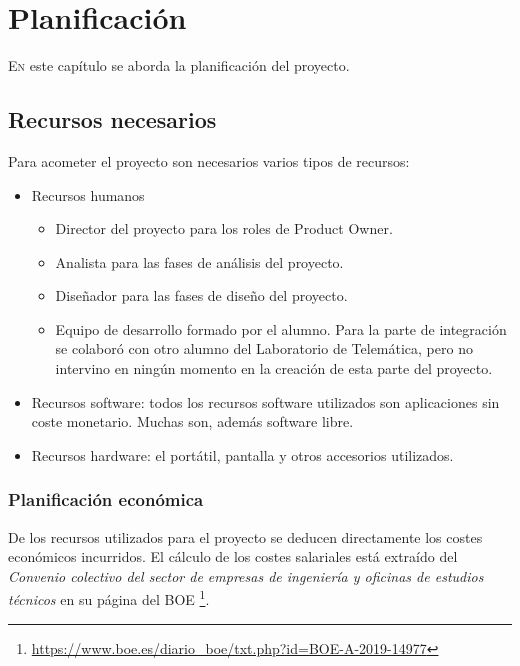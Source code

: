
\chapter{Planificación}
\label{chap:planificación}

\lettrine{E}{n} este capítulo se aborda la planificación del proyecto.

\section{Recursos necesarios}

Para acometer el proyecto son necesarios varios tipos de recursos:

\begin{itemize}
    \item Recursos humanos
        \begin{itemize}
            \item Director del proyecto para los roles de Product Owner.
            \item Analista para las fases de análisis del proyecto.
            \item Diseñador para las fases de diseño del proyecto.
            \item Equipo de desarrollo formado por el alumno. Para la parte de integración se colaboró con otro alumno del Laboratorio de Telemática, pero no intervino en ningún momento en la creación de esta parte del proyecto.
        \end{itemize}
    \item Recursos software: todos los recursos software utilizados son aplicaciones sin coste monetario. Muchas son, además software libre.
    \item Recursos hardware: el portátil, pantalla y otros accesorios utilizados.
\end{itemize}

\subsection{Planificación económica}

De los recursos utilizados para el proyecto se deducen directamente los costes económicos incurridos. El cálculo de los costes salariales está extraído del \emph{Convenio colectivo del sector de empresas de ingeniería y oficinas de estudios técnicos} en su página del BOE \footnote{\url{https://www.boe.es/diario_boe/txt.php?id=BOE-A-2019-14977}}.

